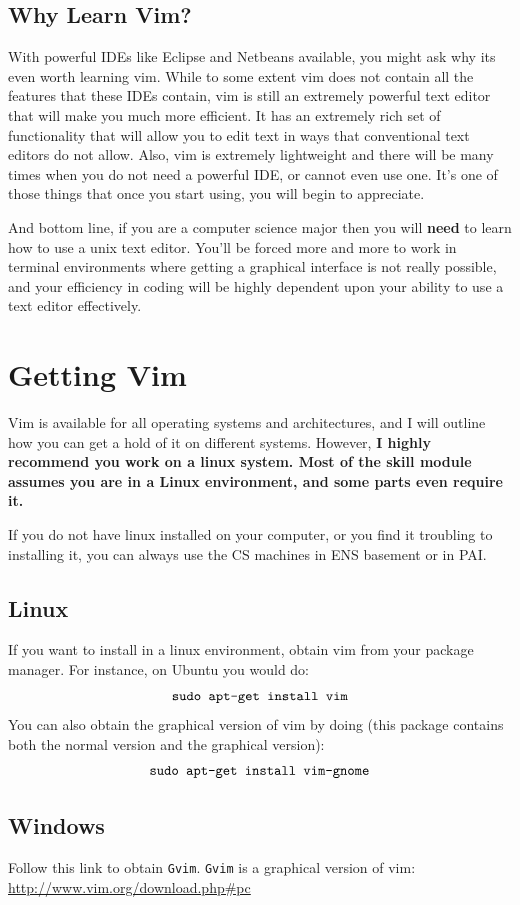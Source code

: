 \subsection{Why Learn Vim?}
With powerful IDEs like Eclipse and Netbeans available, you might ask why
its even worth learning vim. While to some extent vim does not contain
all the features that these IDEs contain, vim is still an 
extremely powerful text editor that will make you much more efficient.
It has an extremely rich set of functionality that will allow you to 
edit text in ways that conventional text editors do not allow. Also,
vim is extremely lightweight and there will be many times when you
do not need a powerful IDE, or cannot even use one. It's one of those
things that once you start using, you will begin to appreciate.

And bottom line, if you are a computer science major then you will {\bf need}
to learn how to use a unix text editor. You'll be forced more and more
to work in terminal environments where getting a graphical interface is not
really possible, and your efficiency in coding will be highly dependent
upon your ability to use a text editor effectively.

\section{Getting Vim}
Vim is available for all operating systems and architectures, and I will
outline how you can get a hold of it on different systems. However, 
{\bf I highly recommend you work on a linux system. Most of the skill module 
assumes you are in a Linux environment, and some parts even require it.}

If you do not have linux installed on your computer, or you find it troubling
to installing it, you can always use the CS machines in ENS basement or 
in PAI.

\subsection{Linux}
If you want to install in a linux environment, obtain vim from your package 
manager. For instance, on Ubuntu you would do:
$$\text{\texttt{sudo apt-get install vim}}$$
You can also obtain the graphical version of vim by doing (this package
contains both the normal version and the graphical version):
$$\text{\texttt{sudo apt-get install vim-gnome}}$$

\subsection{Windows}
Follow this link to obtain \texttt{Gvim}. \texttt{Gvim} is a graphical
version of vim:
\url{http://www.vim.org/download.php#pc}


